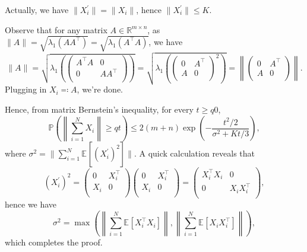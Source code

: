 \begin{answer}
	\begin{claim}
		Actually, we have \(\lVert X_i^{\prime} \rVert = \lVert X_i \rVert \), hence \(\lVert X_i^{\prime} \rVert \leq K\).
	\end{claim}
	\begin{explanation}
		Observe that for any matrix \(A \in \mathbb{R} ^{m \times n}\), as \(\lVert A \rVert = \sqrt{\lambda _1 (A A^{\top} )} = \sqrt{\lambda _1(A ^{\top} A)} \), we have
		\[
			\lVert A \rVert
			= \sqrt{\lambda _1 \left( \begin{pmatrix}
					A^{\top} A & 0          \\
					0          & A A^{\top} \\
				\end{pmatrix} \right) }
			= \sqrt{\lambda _1 \left( \begin{pmatrix}
					0 & A^{\top} \\
					A & 0        \\
				\end{pmatrix}^2 \right) }
			= \left\lVert \begin{pmatrix}
				0 & A^{\top} \\
				A & 0        \\
			\end{pmatrix} \right\rVert.
		\]
		Plugging in \(X_i \eqqcolon A\), we're done.
	\end{explanation}

	Hence, from matrix Bernstein's inequality, for every \(t \geq q 0\),
	\[
		\mathbb{P} \left( \left\lVert \sum_{i=1}^{N} X_i \right\rVert \geq q t \right)
		\leq 2 (m+n) \exp (- \frac{t^2 / 2}{\sigma ^2 + Kt / 3}),
	\]
	where \(\sigma ^2 = \lVert \sum_{i=1}^{N} \mathbb{E}_{}[(X_i ^{\prime}) ^2] \rVert \). A quick calculation reveals that
	\[
		(X_i^{\prime} )^2
		= \begin{pmatrix}
			0   & X_i ^{\top} \\
			X_i & 0           \\
		\end{pmatrix}\begin{pmatrix}
			0   & X_i ^{\top} \\
			X_i & 0           \\
		\end{pmatrix}
		= \begin{pmatrix}
			X_i ^{\top} X_i & 0               \\
			0               & X_i X_i ^{\top} \\
		\end{pmatrix},
	\]
	hence we have
	\[
		\sigma ^2
		= \max \left( \left\lVert \sum_{i=1}^{N} \mathbb{E}_{}[X_i ^{\top} X_i] \right\rVert , \left\lVert \sum_{i=1}^{N} \mathbb{E}_{}[X_i X_i ^{\top} ] \right\rVert \right),
	\]
	which completes the proof.
\end{answer}
